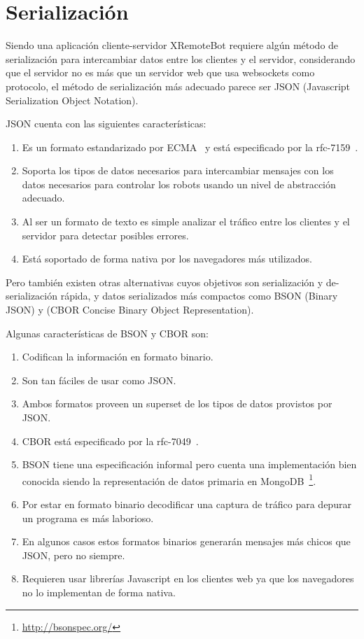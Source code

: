 \chapter{Serialización}\label{cha:serializacion}

Siendo una aplicación cliente-servidor XRemoteBot requiere algún método de
serialización para intercambiar datos entre los clientes y el servidor,
considerando que el servidor no es más que un servidor web que usa websockets
como protocolo, el método de serialización más adecuado parece ser JSON
(Javascript Serialization Object Notation).

JSON cuenta con las siguientes características:

\begin{enumerate}
    \item Es un formato estandarizado por ECMA~\citep{ecma-404}
        y está especificado por la rfc-7159~\citep{rfc-7159}.
    \item Soporta los tipos de datos necesarios para intercambiar mensajes con
        los datos necesarios para controlar los robots usando un nivel de
        abstracción adecuado.
    \item Al ser un formato de texto es simple analizar el tráfico entre los
        clientes y el servidor para detectar posibles errores.
    \item Está soportado de forma nativa por los navegadores más
        utilizados.%
\end{enumerate}

Pero también existen otras alternativas cuyos objetivos son serialización
y de-serialización rápida, y datos serializados más compactos
como BSON (Binary JSON) y (CBOR Concise Binary Object Representation).

Algunas características de BSON y CBOR son:

\begin{enumerate}
    \item Codifican la información en formato binario.
    \item Son tan fáciles de usar como JSON.
    \item Ambos formatos proveen un superset de los tipos de datos provistos
        por JSON.
    \item CBOR está especificado por la rfc-7049~\citep{rfc-7049}.
    \item BSON tiene una especificación informal pero cuenta una
        implementación bien conocida siendo la representación de datos primaria en
        MongoDB~\footnote{\url{http://bsonspec.org/}}.
    \item Por estar en formato binario decodificar una captura de tráfico
        para depurar un programa es más laborioso.
    \item En algunos casos estos formatos binarios generarán mensajes más
        chicos que JSON, pero no siempre.
    \item Requieren usar librerías Javascript en los clientes web ya que los
        navegadores no lo implementan de forma nativa.
\end{enumerate}

